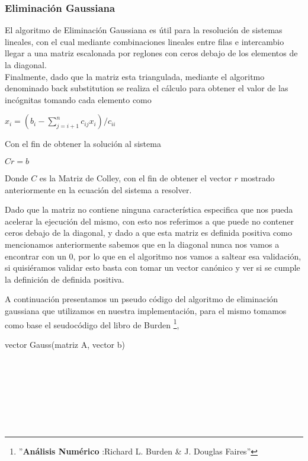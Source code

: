 \subsubsection{Eliminación Gaussiana}

El algoritmo de Eliminación Gaussiana es útil para la resolución de sistemas lineales, con el cual mediante combinaciones lineales entre filas e intercambio  llegar a una matriz escalonada por reglones con ceros debajo de los elementos de la diagonal.\\
Finalmente, dado que la matriz esta triangulada, mediante el algoritmo denominado back substitution se realiza el cálculo para obtener el valor de las incógnitas tomando cada elemento como\\

\begin{center}
$x_i = (b_i - \sum\limits_{j = i + 1}^n c_{ij}x_i) / c_{ii}$ \\
\end{center}

Con el fin de obtener la solución al sistema \\
\begin{center}
$Cr=b$
\end{center}

Donde $C$ es la Matriz de Colley, con el fin de obtener el vector $r$ mostrado anteriormente en la ecuación del sistema a resolver. 

Dado que la matriz no contiene ninguna característica especifica que nos pueda acelerar la ejecución del mismo, con esto nos referimos a que puede no contener ceros debajo de la diagonal, y dado a que esta matriz es definida positiva como mencionamos anteriormente sabemos que en la diagonal nunca nos vamos a encontrar con un 0, por lo que en el algoritmo nos vamos a saltear esa validación,
si quisiéramos validar esto basta con tomar un vector canónico y ver si se cumple la definición de definida positiva.

A continuación presentamos un pseudo código del algoritmo de eliminación gaussiana que utilizamos en nuestra implementación, para el mismo tomamos como base el seudocódigo del libro de Burden \footnote{''\textbf{Análisis Numérico }:Richard L. Burden & J. Douglas Faires''},

\begin{algorithm}
    \begin{algorithmic}[1]\parskip=2mm  
        \caption{vector Gauss(matriz A, vector b)}
        \\
        \\
        \\
        \\
        \\
        \\
    \end{algorithmic}
\end{algorithm}


